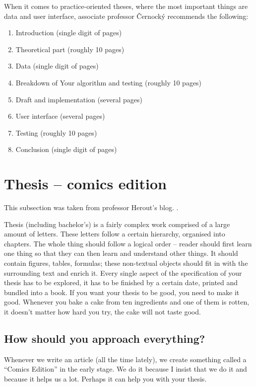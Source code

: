 When it comes to practice-oriented theses, where the most important things are data and user interface, associate professor Černocký \cite{Cernocky} recommends the following:
\begin{enumerate}
\item Introduction (single digit of pages)
\item Theoretical part (roughly 10 pages)
\item Data (single digit of pages)
\item Breakdown of Your algorithm and testing (roughly 10 pages)
\item Draft and implementation (several pages)
\item User interface (several pages)
\item Testing (roughly 10 pages)
\item Conclusion (single digit of pages)
\end{enumerate}

\section{Thesis -- comics edition}

This subsection was taken from professor Herout's blog. \cite{Herout}.

Thesis (including bachelor's) is a fairly complex work comprised of a large amount of letters. These letters follow a certain hierarchy, organised into chapters. The whole thing should follow a logical order -- reader should first learn one thing so that they can then learn and understand other things. It should contain figures, tables, formulas; these non-textual objects should fit in with the surrounding text and enrich it. Every single aspect of the specification of your thesis has to be explored, it has to be finished by a certain date, printed and bundled into a book. If you want your thesis to be good, you need to make it good. Whenever you bake a cake from ten ingredients and one of them is rotten, it doesn't matter how hard you try, the cake will not taste good.

\subsection*{How should you approach everything?}

Whenever we write an article (all the time lately), we create something called a ``Comics Edition'' in the early stage. We do it because I insist that we do it and because it helps us a lot. Perhaps it can help you with your thesis.

